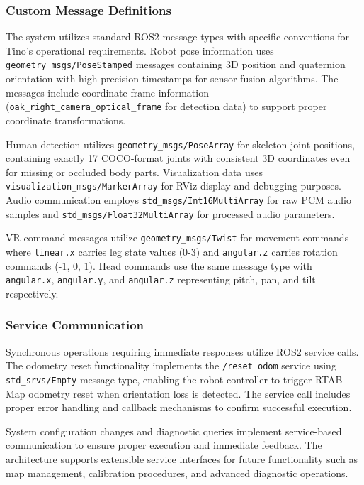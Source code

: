 \subsubsection{Custom Message Definitions}

The system utilizes standard ROS2 message types with specific conventions for Tino's operational requirements. Robot pose information uses \texttt{geometry\_msgs/PoseStamped} messages containing 3D position and quaternion orientation with high-precision timestamps for sensor fusion algorithms. The messages include coordinate frame information (\texttt{oak\_right\_camera\_optical\_frame} for detection data) to support proper coordinate transformations.

Human detection utilizes \texttt{geometry\_msgs/PoseArray} for skeleton joint positions, containing exactly 17 COCO-format joints with consistent 3D coordinates even for missing or occluded body parts. Visualization data uses \texttt{visualization\_msgs/MarkerArray} for RViz display and debugging purposes. Audio communication employs \texttt{std\_msgs/Int16MultiArray} for raw PCM audio samples and \texttt{std\_msgs/Float32MultiArray} for processed audio parameters.

VR command messages utilize \texttt{geometry\_msgs/Twist} for movement commands where \texttt{linear.x} carries leg state values (0-3) and \texttt{angular.z} carries rotation commands (-1, 0, 1). Head commands use the same message type with \texttt{angular.x}, \texttt{angular.y}, and \texttt{angular.z} representing pitch, pan, and tilt respectively.

\subsubsection{Service Communication}

Synchronous operations requiring immediate responses utilize ROS2 service calls. The odometry reset functionality implements the \texttt{/reset\_odom} service using \texttt{std\_srvs/Empty} message type, enabling the robot controller to trigger RTAB-Map odometry reset when orientation loss is detected. The service call includes proper error handling and callback mechanisms to confirm successful execution.

System configuration changes and diagnostic queries implement service-based communication to ensure proper execution and immediate feedback. The architecture supports extensible service interfaces for future functionality such as map management, calibration procedures, and advanced diagnostic operations.

